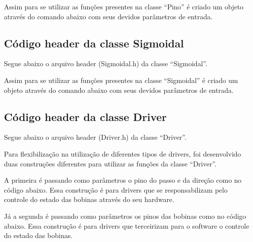 {

Assim para se utilizar as funções presentes na classe “Pino” é criado um objeto 
através do comando abaixo com seus devidos parâmetros de entrada.



\subsection{Código header da classe Sigmoidal}\label{subsec:ressigmoidal}

Segue abaixo o arquivo header (Sigmoidal.h) da classe “Sigmoidal”.



Assim para se utilizar as funções presentes na classe “Sigmoidal” é criado um objeto 
através do comando abaixo com seus devidos parâmetros de entrada.



\subsection{Código header da classe Driver}\label{subsec:resdriver}
Segue abaixo o arquivo header (Driver.h) da classe “Driver”.



Para flexibilização na utilização de diferentes tipos de drivers, foi desenvolvido 
duas construções diferentes para utilizar as funções da classe “Driver”.

A primeira é passando como parâmetros o pino do passo e da direção como no código abaixo.
Essa construção é para drivers que se responsabilizam pelo controle do estado 
das bobinas através do seu hardware.



Já a segunda é passando como parâmetros os pinos das bobinas como no código abaixo.
Essa construção é para drivers que terceirizam para o software o controle
do estado das bobinas.

}
